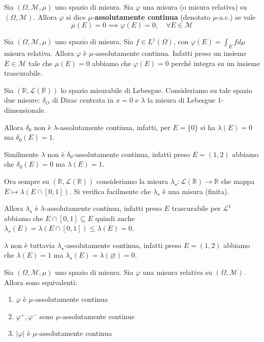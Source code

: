 \begin{definition}
    Sia \((\Omega, \mathcal{M}, \mu)\) uno spazio di misura. Sia \(\varphi\) una
    misura (o misura relativa) su \((\Omega, \mathcal{M})\). Allora \(\varphi\)
    si dice \(\mu\)-\textbf{assolutamente continua} (denotato \(\mu\)-a.c.) se
    vale 
    \[
        \mu(E) = 0 \implies \varphi(E) = 0, \quad \forall E \in \mathcal{M}
    \]
\end{definition}
\begin{example}
    Sia \((\Omega, \mathcal{M}, \mu)\) uno spazio di misura. Sia \(f \in
    L^{1}(\Omega)\), con \(\varphi(E) = \int_E f d\mu\) misura relativa. Allora
    \(\varphi\) è \(\mu\)-assolutamente continua. Infatti preso un insieme \(E \in
    \mathcal{M}\) tale che \(\mu(E) = 0\) abbiamo che \(\varphi(E) = 0\) perché
    integra su un insieme trascurabile.
\end{example}
\begin{example}
    Sia \((\mathbb{R}, \mathcal{L}(\mathbb{R}))\) lo spazio misurabile di
    Lebesgue. Consideriamo su tale spazio due misure: \(\delta_O\)
    di Dirac centrata in \(x=0\) e \(\lambda\) la misura di Lebesgue
    1-dimensionale. 

    Allora \(\delta_0\) non è \(\lambda\)-assolutamente continua, infatti, per \(E =\{0\} \)
    si ha \(\lambda(E) = 0\) ma \(\delta_0(E) = 1\). 

    Similmente \(\lambda\) non è \(\delta_0\)-assolutamente continua, infatti preso
    \(E = (1, 2)\) abbiamo che \(\delta_0(E) = 0\) ma \(\lambda(E) = 1\).
\end{example}
\begin{example}
    Ora sempre su \((\mathbb{R}, \mathcal{L}(\mathbb{R}))\) consideriamo la
    misura \(\lambda_{\star} : \mathcal{L}(\mathbb{R}) \to
    \mathbb{R}\) che mappa \(E \mapsto \lambda(E \cap [0, 1])\). Si verifica facilmente che \(\lambda_\star\) è una misura (finita).

    Allora \(\lambda_\star\) è \(\lambda\)-assolutamente continua, infatti preso \(E\) trascurabile per \(\mathcal{L}^{1}\) abbiamo
    che \(E \cap [0, 1] \subseteq E \) quindi anche \(\lambda_{\star}(E)
    = \lambda(E \cap [0,1]) \le \lambda(E) = 0\).

    \(\lambda\) non è tuttavia \(\lambda_\star\)-assolutamente
    continua, infatti preso \(E = (1, 2)\) abbiamo che \(\lambda(E) =
    1\) ma \(\lambda_\star(E) = \lambda(\varnothing)= 0\).
\end{example}
\begin{proposition}\label{prop:equivalenti_ac}
    Sia \((\Omega, \mathcal{M}, \mu)\) uno spazio di misura. Sia \(\varphi\) una
    misura relativa su \((\Omega, \mathcal{M})\). Allora sono equivalenti:
\begin{enumerate}[label = \roman*)]
    \item \(\varphi\) è \(\mu\)-assolutamente continua
    \item \(\varphi^{+}, \varphi^{-}\) sono \(\mu\)-assolutamente continue
    \item \(|\varphi|\) è \(\mu\)-assolutamente continua
\end{enumerate}
\end{proposition}
